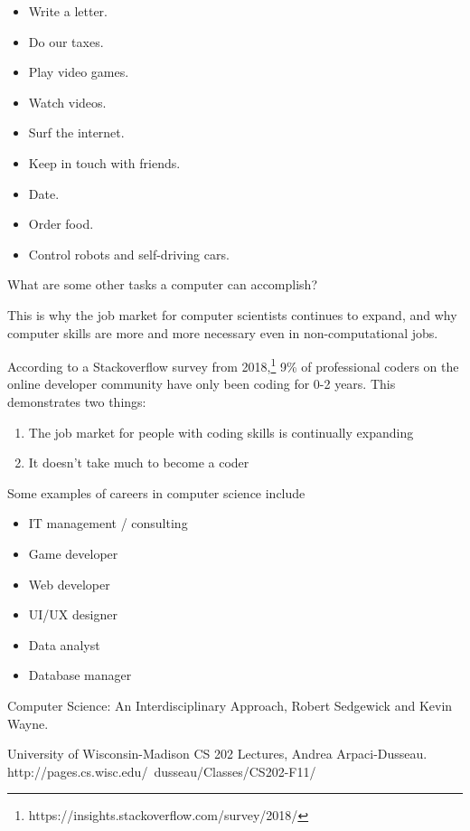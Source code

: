 \begin{itemize}
	\item Write a letter.
	\item Do our taxes.
	\item Play video games.
	\item Watch videos.
	\item Surf the internet.
	\item Keep in touch with friends.
	\item Date.
	\item Order food.
	\item Control robots and self-driving cars.
\end{itemize}

\begin{exercise}
What are some other tasks a computer can accomplish?
\end{exercise}

This is why the job market for computer scientists continues to expand, and why computer skills are more and more necessary even in non-computational jobs.

According to a Stackoverflow survey from 2018,\footnote{https://insights.stackoverflow.com/survey/2018/} 9\% of professional coders on the online developer community have only been coding for 0-2 years. This demonstrates two things:

\begin{enumerate}
	\item The job market for people with coding skills is continually expanding
	\item It doesn't take much to become a coder
\end{enumerate}

Some examples of careers in computer science include

\begin{itemize}
\item IT management / consulting
\item Game developer
\item Web developer
\item UI/UX designer
\item Data analyst
\item Database manager
\end{itemize}



Computer Science: An Interdisciplinary Approach, Robert Sedgewick and Kevin Wayne.

University of Wisconsin-Madison CS 202 Lectures, Andrea Arpaci-Dusseau.\\http://pages.cs.wisc.edu/~dusseau/Classes/CS202-F11/
